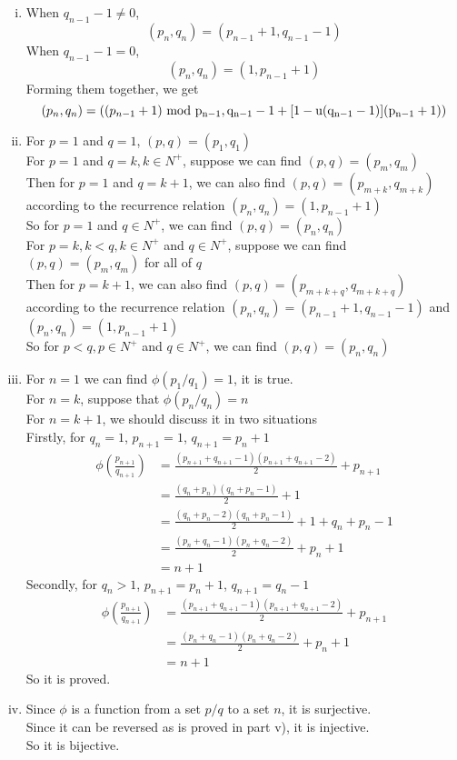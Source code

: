 \documentclass{article}
\begin{document}
\section{}
\begin{enumerate}[i)]
\item
When $q_{n-1}-1\neq0$,
$$(p_n,q_n)=(p_{n-1}+1,q_{n-1}-1)$$
When $q_{n-1}-1=0$,
$$(p_n,q_n)=(1,p_{n-1}+1)$$
Forming them together, we get
$$(p_n,q_n)=((p_{n-1}+1)\ \rm{mod}\ p_{n-1},q_{n-1}-1+[1-u(q_{n-1}-1)](p_{n-1}+1))$$
\item
For $p=1$ and $q=1$, $(p,q)=(p_1,q_1)$\\

For $p=1$ and $q=k,k\in N^+$, suppose we can find $(p,q)=(p_m,q_m)$\\
Then for $p=1$ and $q=k+1$, we can also find $(p,q)=(p_{m+k},q_{m+k})$ according to the recurrence relation $(p_n,q_n)=(1,p_{n-1}+1)$\\
So for $p=1$ and $q\in N^+$, we can find $(p,q)=(p_n,q_n)$\\

For $p=k,k<q,k\in N^+$ and $q\in N^+$, suppose we can find $(p,q)=(p_m,q_m)$ for all of $q$\\
Then for $p=k+1$, we can also find $(p,q)=(p_{m+k+q},q_{m+k+q})$ according to the recurrence relation $(p_n,q_n)=(p_{n-1}+1,q_{n-1}-1)$ and $(p_n,q_n)=(1,p_{n-1}+1)$\\
So for $p<q,p\in N^+$ and $q\in N^+$, we can find $(p,q)=(p_n,q_n)$\\

\item
For $n=1$ we can find $\phi(p_1/q_1)=1$, it is true.\\
For $n=k$, suppose that $\phi(p_n/q_n)=n$\\
For $n=k+1$, we should discuss it in two situations\\
Firstly, for $q_n=1$, $p_{n+1}=1$, $q_{n+1}=p_n+1$
\begin{align*}
\phi\left(\frac{p_{n+1}}{q_{n+1}}\right)
&=\frac{(p_{n+1}+q_{n+1}-1)(p_{n+1}+q_{n+1}-2)}{2}+p_{n+1}\\
&=\frac{(q_n+p_n)(q_n+p_n-1)}{2}+1\\
&=\frac{(q_n+p_n-2)(q_n+p_n-1)}{2}+1+q_n+p_n-1\\
&=\frac{(p_n+q_n-1)(p_n+q_n-2)}{2}+p_n+1\\
&=n+1
\end{align*}
Secondly, for $q_n>1$, $p_{n+1}=p_n+1$, $q_{n+1}=q_n-1$
\begin{align*}
\phi\left(\frac{p_{n+1}}{q_{n+1}}\right)
&=\frac{(p_{n+1}+q_{n+1}-1)(p_{n+1}+q_{n+1}-2)}{2}+p_{n+1}\\
&=\frac{(p_n+q_n-1)(p_n+q_n-2)}{2}+p_n+1\\
&=n+1
\end{align*}
So it is proved.
\item
Since $\phi$ is a function from a set $p/q$ to a set $n$, it is surjective.\\
Since it can be reversed as is proved in part v), it is injective.\\
So it is bijective.


\end{enumerate}
\end{document}
